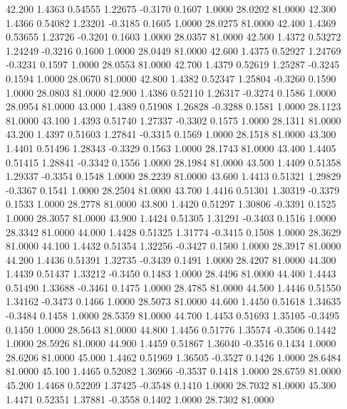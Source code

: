   42.200   1.4363   0.54555   1.22675  -0.3170   0.1607   1.0000  28.0202  81.0000
  42.300   1.4366   0.54082   1.23201  -0.3185   0.1605   1.0000  28.0275  81.0000
  42.400   1.4369   0.53655   1.23726  -0.3201   0.1603   1.0000  28.0357  81.0000
  42.500   1.4372   0.53272   1.24249  -0.3216   0.1600   1.0000  28.0449  81.0000
  42.600   1.4375   0.52927   1.24769  -0.3231   0.1597   1.0000  28.0553  81.0000
  42.700   1.4379   0.52619   1.25287  -0.3245   0.1594   1.0000  28.0670  81.0000
  42.800   1.4382   0.52347   1.25804  -0.3260   0.1590   1.0000  28.0803  81.0000
  42.900   1.4386   0.52110   1.26317  -0.3274   0.1586   1.0000  28.0954  81.0000
  43.000   1.4389   0.51908   1.26828  -0.3288   0.1581   1.0000  28.1123  81.0000
  43.100   1.4393   0.51740   1.27337  -0.3302   0.1575   1.0000  28.1311  81.0000
  43.200   1.4397   0.51603   1.27841  -0.3315   0.1569   1.0000  28.1518  81.0000
  43.300   1.4401   0.51496   1.28343  -0.3329   0.1563   1.0000  28.1743  81.0000
  43.400   1.4405   0.51415   1.28841  -0.3342   0.1556   1.0000  28.1984  81.0000
  43.500   1.4409   0.51358   1.29337  -0.3354   0.1548   1.0000  28.2239  81.0000
  43.600   1.4413   0.51321   1.29829  -0.3367   0.1541   1.0000  28.2504  81.0000
  43.700   1.4416   0.51301   1.30319  -0.3379   0.1533   1.0000  28.2778  81.0000
  43.800   1.4420   0.51297   1.30806  -0.3391   0.1525   1.0000  28.3057  81.0000
  43.900   1.4424   0.51305   1.31291  -0.3403   0.1516   1.0000  28.3342  81.0000
  44.000   1.4428   0.51325   1.31774  -0.3415   0.1508   1.0000  28.3629  81.0000
  44.100   1.4432   0.51354   1.32256  -0.3427   0.1500   1.0000  28.3917  81.0000
  44.200   1.4436   0.51391   1.32735  -0.3439   0.1491   1.0000  28.4207  81.0000
  44.300   1.4439   0.51437   1.33212  -0.3450   0.1483   1.0000  28.4496  81.0000
  44.400   1.4443   0.51490   1.33688  -0.3461   0.1475   1.0000  28.4785  81.0000
  44.500   1.4446   0.51550   1.34162  -0.3473   0.1466   1.0000  28.5073  81.0000
  44.600   1.4450   0.51618   1.34635  -0.3484   0.1458   1.0000  28.5359  81.0000
  44.700   1.4453   0.51693   1.35105  -0.3495   0.1450   1.0000  28.5643  81.0000
  44.800   1.4456   0.51776   1.35574  -0.3506   0.1442   1.0000  28.5926  81.0000
  44.900   1.4459   0.51867   1.36040  -0.3516   0.1434   1.0000  28.6206  81.0000
  45.000   1.4462   0.51969   1.36505  -0.3527   0.1426   1.0000  28.6484  81.0000
  45.100   1.4465   0.52082   1.36966  -0.3537   0.1418   1.0000  28.6759  81.0000
  45.200   1.4468   0.52209   1.37425  -0.3548   0.1410   1.0000  28.7032  81.0000
  45.300   1.4471   0.52351   1.37881  -0.3558   0.1402   1.0000  28.7302  81.0000
